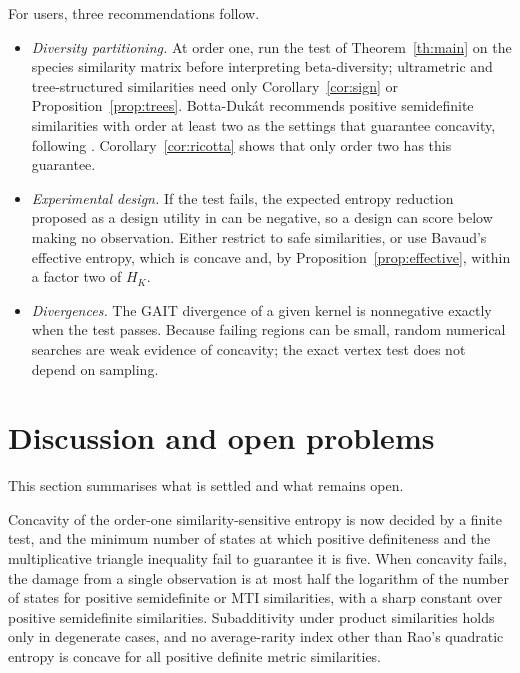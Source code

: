 \documentclass[11pt,a4paper]{article}
\theoremstyle{remark}
\begin{document}
For users, three recommendations follow.
\begin{itemize}
\item \emph{Diversity partitioning.} At order one, run the test of Theorem~\ref{th:main} on the species similarity matrix before interpreting beta-diversity; ultrametric and tree-structured similarities need only Corollary~\ref{cor:sign} or Proposition~\ref{prop:trees}. Botta-Duk\'at \cite[p.~44]{botta} recommends positive semidefinite similarities with order at least two as the settings that guarantee concavity, following \cite[Theorem 2]{rs}. Corollary~\ref{cor:ricotta} shows that only order two has this guarantee.
\item \emph{Experimental design.} If the test fails, the expected entropy reduction proposed as a design utility in \cite[Section 6.2]{miller} can be negative, so a design can score below making no observation. Either restrict to safe similarities, or use Bavaud's effective entropy, which is concave and, by Proposition~\ref{prop:effective}, within a factor two of $H_K$.
\item \emph{Divergences.} The GAIT divergence of a given kernel is nonnegative exactly when the test passes. Because failing regions can be small, random numerical searches are weak evidence of concavity; the exact vertex test does not depend on sampling.
\end{itemize}

\section{Discussion and open problems}\label{sec:discussion}
This section summarises what is settled and what remains open.

Concavity of the order-one similarity-sensitive entropy is now decided by a finite test, and the minimum number of states at which positive definiteness and the multiplicative triangle inequality fail to guarantee it is five. When concavity fails, the damage from a single observation is at most half the logarithm of the number of states for positive semidefinite or MTI similarities, with a sharp constant over positive semidefinite similarities. Subadditivity under product similarities holds only in degenerate cases, and no average-rarity index other than Rao's quadratic entropy is concave for all positive definite metric similarities.
\end{document}
